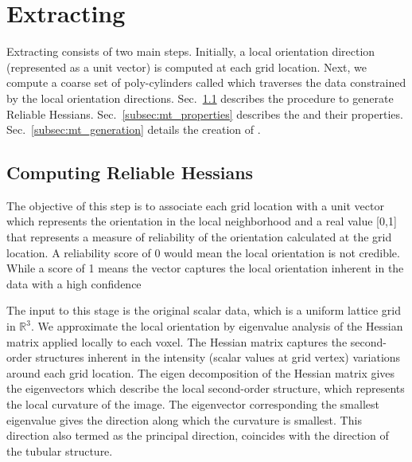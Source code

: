 \section{Extracting \mt}\label{sec:ext_mt}
Extracting \mt consists of two main steps. Initially, a local orientation direction (represented as a unit vector) is computed at each grid location.
Next, we compute a coarse set of poly-cylinders called \mt which traverses the data constrained by the local orientation directions. Sec.~\ref{subsec:reliable_hessian} describes the procedure to generate Reliable Hessians. Sec.~\ref{subsec:mt_properties}  describes the \mt and their properties. Sec.~\ref{subsec:mt_generation} details the creation of \mt.
\subsection{Computing Reliable Hessians}\label{subsec:reliable_hessian} 
The objective of this step is to associate each grid location with a unit vector which represents the orientation in the local neighborhood and a real value [0,1] that represents a measure of reliability of the orientation calculated at the grid location. A reliability score of 0 would mean the local orientation is not credible. While a score of 1 means the vector captures the local orientation inherent in the data with a high confidence

The input to this stage is the original scalar data, which is a uniform lattice grid in $\mathbb{R}^3$. We approximate the local orientation  by eigenvalue analysis of the Hessian matrix applied locally to each voxel.
The Hessian matrix captures the second-order structures inherent in the intensity (scalar values at grid vertex) variations around each grid location.
The eigen decomposition of the Hessian matrix gives the eigenvectors which describe the local second-order structure, which represents the local curvature of the image. The eigenvector corresponding the smallest eigenvalue gives the direction along which the curvature is smallest. This direction also termed as the principal direction, coincides with the direction of the tubular structure. 


